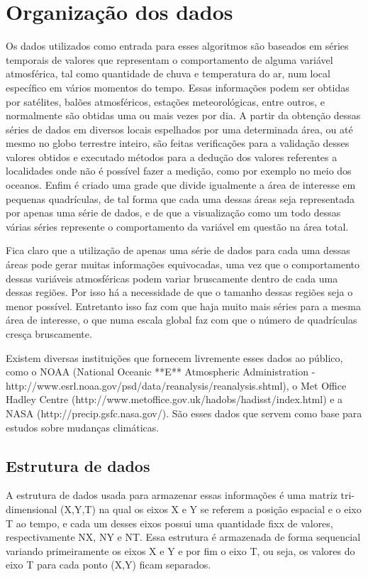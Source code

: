 \chapter{Organização dos dados}

Os dados utilizados como entrada para esses algoritmos são baseados em séries temporais de valores que representam o comportamento de alguma variável atmosférica, tal como quantidade de chuva e temperatura do ar, num local específico em vários momentos do tempo. Essas informações podem ser obtidas por satélites, balões atmosféricos, estações meteorológicas, entre outros, e normalmente são obtidas uma ou mais vezes por dia. A partir da obtenção dessas séries de dados em diversos locais espelhados por uma determinada área, ou até mesmo no globo terrestre inteiro, são feitas verificações para a validação desses valores obtidos e executado métodos para a dedução dos valores referentes a localidades onde não é possível fazer a medição, como por exemplo no meio dos oceanos. Enfim é criado uma grade que divide igualmente a área de interesse em pequenas quadrículas, de tal forma que cada uma dessas áreas seja representada por apenas uma série de dados, e de que a visualização como um todo dessas várias séries represente o comportamento da variável em questão na área total. 

Fica claro que a utilização de apenas uma série de dados para cada uma dessas áreas pode gerar muitas informações equivocadas, uma vez que o comportamento dessas variáveis atmosféricas podem variar bruscamente dentro de cada uma dessas regiões. Por isso há a necessidade de que o tamanho dessas regiões seja o menor possível. Entretanto isso faz com que haja muito mais séries para a mesma área de interesse, o que numa escala global faz com que o número de quadrículas cresça bruscamente.

Existem diversas instituições que fornecem livremente esses dados ao público, como o NOAA (National Oceanic **E** Atmospheric Administration - http://www.esrl.noaa.gov/psd/data/reanalysis/reanalysis.shtml), o Met Office Hadley Centre (http://www.metoffice.gov.uk/hadobs/hadisst/index.html) e a NASA (http://precip.gsfc.nasa.gov/). São esses dados que servem como base para estudos sobre mudanças climáticas.

\section{Estrutura de dados}

A estrutura de dados usada para armazenar essas informações é uma matriz tri-dimensional (X,Y,T) na qual os eixos X e Y se referem a posição espacial e o eixo T ao tempo, e cada um desses eixos possui uma quantidade fixx de valores, respectivamente NX, NY e NT. Essa estrutura é armazenada de forma sequencial variando primeiramente os eixos X e Y e por fim o eixo T, ou seja, os valores do eixo T para cada ponto (X,Y) ficam separados.

